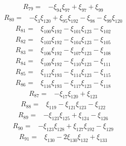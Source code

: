 \[
\begin{aligned}
 R_{79}={}&-\xi_{94}\xi_{97}+\xi_{97}+\xi_{99}
\end{aligned}
\]
\[
\begin{aligned}
 R_{80}={}&-\xi_{3}\xi_{120}+\xi_{95}\xi_{192}-\xi_{98}-\xi_{99}\xi_{120}
\end{aligned}
\]
\[
\begin{aligned}
 R_{81}={}&\xi_{100}\xi_{192}-\xi_{101}\xi_{123}-\xi_{102}
\end{aligned}
\]
\[
\begin{aligned}
 R_{82}={}&\xi_{103}\xi_{192}-\xi_{104}\xi_{123}-\xi_{105}
\end{aligned}
\]
\[
\begin{aligned}
 R_{83}={}&\xi_{106}\xi_{192}-\xi_{107}\xi_{123}-\xi_{108}
\end{aligned}
\]
\[
\begin{aligned}
 R_{84}={}&\xi_{109}\xi_{192}-\xi_{110}\xi_{123}-\xi_{111}
\end{aligned}
\]
\[
\begin{aligned}
 R_{85}={}&\xi_{112}\xi_{193}-\xi_{114}\xi_{123}-\xi_{115}
\end{aligned}
\]
\[
\begin{aligned}
 R_{86}={}&\xi_{116}\xi_{193}-\xi_{117}\xi_{123}-\xi_{118}
\end{aligned}
\]
\[
\begin{aligned}
 R_{87}={}&-\xi_{17}\xi_{120}+\xi_{123}
\end{aligned}
\]
\[
\begin{aligned}
 R_{88}={}&\xi_{119}-\xi_{121}\xi_{123}-\xi_{122}
\end{aligned}
\]
\[
\begin{aligned}
 R_{89}={}&-\xi_{123}\xi_{125}+\xi_{124}-\xi_{126}
\end{aligned}
\]
\[
\begin{aligned}
 R_{90}={}&-\xi_{123}\xi_{128}+\xi_{127}\xi_{192}-\xi_{129}
\end{aligned}
\]
\[
\begin{aligned}
 R_{91}={}&\xi_{130}-2\xi_{130}\xi_{132}+\xi_{133}
\end{aligned}
\]
